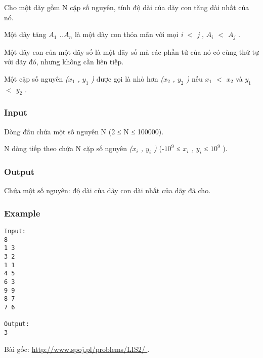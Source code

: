 



   Cho một dãy gồm       N      cặp số nguyên, tính độ dài của       dãy con tăng dài nhất      của nó.  

   Một       dãy tăng      \textit{    $A_{1}$    ..$A_{n}$}   là một dãy con thỏa mãn với mọi   \textit{    i $<$ j   }   ,   \textit{    $A_{i}$    $<$ $A_{j}$}   .  

   Một       dãy con      của một dãy số là một dãy số mà các phần tử của nó có cùng thứ tự với dãy đó, nhưng không cần liên tiếp.  

   Một cặp số nguyên   \textit{    ($x_{1}$    , $y_{1}$    )   }   được gọi là nhỏ hơn   \textit{    ($x_{2}$    , $y_{2}$    )   }       nếu      \textit{    $x_{1}$    $<$ $x_{2}$}   và   \textit{    $y_{1}$    $<$ $y_{2}$}   .  

\subsubsection{   Input  }

   Dòng đầu chứa một số nguyên       N      (2 ≤       N      ≤ 100000).  

       N      dòng tiếp theo chứa       N      cặp số nguyên   \textit{    ($x_{i}$    , $y_{i}$    )   }   (-$10^{9}$   ≤   \textit{    $x_{i}$    , $y_{i}$}   ≤ $10^{9}$   ).  

\subsubsection{   Output  }

   Chứa một số nguyên: độ dài của dãy con dài nhất của dãy đã cho.  

\subsubsection{   Example  }
\begin{verbatim}
Input:
8
1 3
3 2
1 1
4 5
6 3
9 9
8 7
7 6

Output:
3
\end{verbatim}

   Bài gốc:   \href{http://www.spoj.pl/problems/LIS2/}{    http://www.spoj.pl/problems/LIS2/   }   .  
